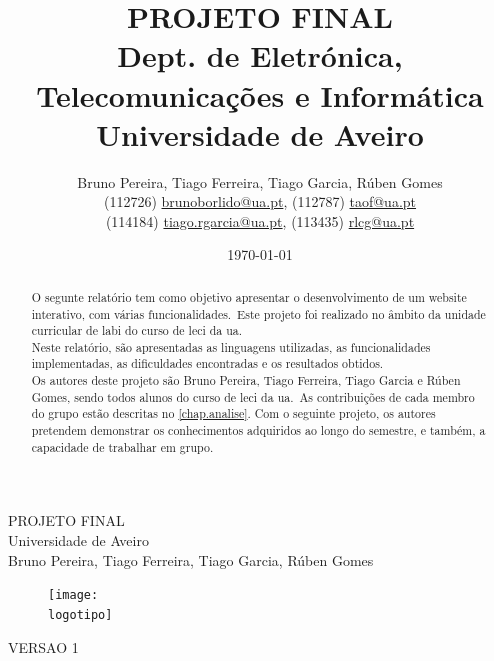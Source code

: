 \documentclass{report}
\begin{document}
%
\def\titulo{PROJETO FINAL}
\def\data{DATA}
\def\autores{Bruno Pereira, Tiago Ferreira, Tiago Garcia, Rúben Gomes}
\def\autorescontactos{(112726) \href{mailto:brunoborlido@ua.pt}{brunoborlido@ua.pt}, (112787) \href{mailto:taof@ua.pt}{taof@ua.pt}\\(114184) \href{mailto:tiago.rgarcia@ua.pt}{tiago.rgarcia@ua.pt}, (113435) \href{mailto:rlcg@ua.pt}{rlcg@ua.pt}}
\def\versao{VERSAO 1}
\def\departamento{Dept. de Eletrónica, Telecomunicações e Informática}
\def\empresa{Universidade de Aveiro}
\def\logotipo{../images/ua.pdf}
%
%
\begin{titlepage}

\begin{center}
%
\vspace*{50mm}
%
{\Huge \titulo}\\ 
%
\vspace{10mm}
%
{\Large \empresa}\\
%
\vspace{10mm}
%
{\LARGE \autores}\\ 
%
\vspace{30mm}
%
\begin{figure}[h]
\center
\texttt{[image: \\logotipo]}
\end{figure}
%
\vspace{30mm}
\end{center}
%
\begin{flushright}
\versao
\end{flushright}
\end{titlepage}

\title{%
{\Huge\textbf{\titulo}}\\
{\Large \departamento\\ \empresa}
}
%
\author{%
    \autores \\
    \autorescontactos
}
%
\date{\today}
%
\maketitle


\begin{abstract}
    O segunte relatório tem como objetivo apresentar o desenvolvimento de um website interativo, com várias funcionalidades.\ Este projeto foi realizado no âmbito da unidade curricular de \ac{labi} do curso de \ac{leci} da \ac{ua}.\\
    Neste relatório, são apresentadas as linguagens utilizadas, as funcionalidades implementadas, as dificuldades encontradas e os resultados obtidos.\\
    Os autores deste projeto são Bruno Pereira, Tiago Ferreira, Tiago Garcia e Rúben Gomes, sendo todos alunos do curso de \ac{leci} da \ac{ua}.\ As contribuições de cada membro do grupo estão descritas no \autoref{chap.analise}.
    Com o seguinte projeto, os autores pretendem demonstrar os conhecimentos adquiridos ao longo do semestre, e também, a capacidade de trabalhar em grupo.

\end{abstract}
\end{document}
